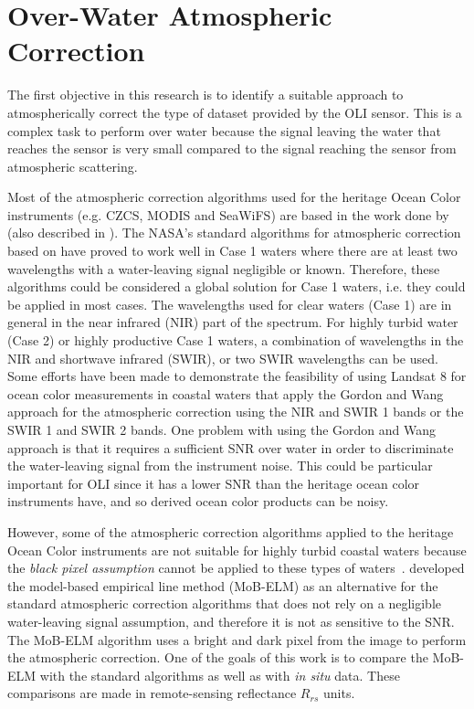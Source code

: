 \section{Over-Water Atmospheric Correction} 
\label{sec:atmcorr}
The first objective in this research is to identify a suitable approach to atmospherically correct the type of dataset provided by the OLI sensor. This is a complex task to perform over water because the signal leaving the water that reaches the sensor is very small compared to the signal reaching the sensor from atmospheric scattering. 

Most of the atmospheric correction algorithms used for the heritage Ocean Color instruments (e.g. CZCS, MODIS and SeaWiFS) are based in the work done by \cite{Gordon:1994} (also described in \cite{Gordon:1997}). The NASA's standard algorithms for atmospheric correction based on \cite{Gordon:1994} have proved to work well in Case 1 waters where there are at least two wavelengths with a water-leaving signal negligible or known. Therefore, these algorithms could be considered a global solution for Case 1 waters, i.e. they could be applied in most cases. The wavelengths used for clear waters (Case 1) are in general in the near infrared (NIR) part of the spectrum. For highly turbid water (Case 2) or highly productive Case 1 waters, a combination of wavelengths in the NIR and shortwave infrared (SWIR), or two SWIR wavelengths can be used\cite{Wang:2007,Wang:2007dz,Wang2009}. Some efforts have been made to demonstrate the feasibility of using Landsat 8 for ocean color measurements in coastal waters that apply the Gordon and Wang approach\cite{Vanhellemont2014a,Vanhellemont2014,Vanhellemont:2015,Franz:2015} for the atmospheric correction using the NIR and SWIR 1 bands or the SWIR 1 and SWIR 2 bands. One problem with using the Gordon and Wang approach is that it requires a sufficient SNR over water in order to discriminate the water-leaving signal from the instrument noise. This could be particular important for OLI since it has a lower SNR than the heritage ocean color instruments have, and so derived ocean color products can be noisy.

However, some of the atmospheric correction algorithms applied to the heritage Ocean Color instruments are not suitable for highly turbid coastal waters because the {\it black pixel assumption} cannot be applied to these types of waters~\cite{Patt2003}. \cite{Concha2014SPIE} developed the model-based empirical line method (MoB-ELM) as an alternative for the standard atmospheric correction algorithms that does not rely on a negligible water-leaving signal assumption, and therefore it is not as sensitive to the SNR. The MoB-ELM algorithm uses a bright and dark pixel from the image to perform the atmospheric correction. One of the goals of this work is to compare the MoB-ELM with the standard algorithms as well as with {\it in situ} data. These comparisons are made in remote-sensing reflectance $R_{rs}$ units. 

